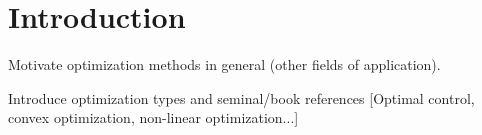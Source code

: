 
\section{Introduction}\label{sec:1}

Motivate optimization methods in general (other fields of application).

Introduce optimization types and seminal/book references [Optimal control, convex optimization, non-linear optimization...]
